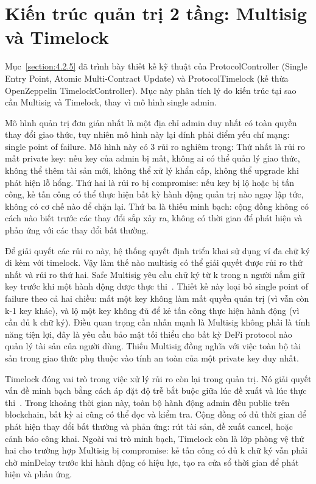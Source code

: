 \documentclass[../DoAn.tex]{subfiles}
\begin{document}
\section{Kiến trúc quản trị 2 tầng: Multisig và Timelock}
\label{section:5.6}


Mục~\ref{section:4.2.5} đã trình bày thiết kế kỹ thuật của ProtocolController (Single Entry Point, Atomic Multi-Contract Update) và ProtocolTimelock (kế thừa OpenZeppelin TimelockController). Mục này phân tích lý do kiến trúc tại sao cần Multisig và Timelock, thay vì mô hình single admin.

Mô hình quản trị đơn giản nhất là một địa chỉ admin duy nhất có toàn quyền thay đổi giao thức, tuy nhiên mô hình này lại dính phải điểm yếu chí mạng: single point of failure. Mô hình này có 3 rủi ro nghiêm trọng: Thứ nhất là rủi ro mất private key: nếu key của admin bị mất, không ai có thể quản lý giao thức, không thể thêm tài sản mới, không thể xử lý khẩn cấp, không thể upgrade khi phát hiện lỗ hổng. Thứ hai là rủi ro bị compromise: nếu key bị lộ hoặc bị tấn công, kẻ tấn công có thể thực hiện bất kỳ hành động quản trị nào ngay lập tức, không có cơ chế nào để chặn lại. Thứ ba là thiếu minh bạch: cộng đồng không có cách nào biết trước các thay đổi sắp xảy ra, không có thời gian để phát hiện và phản ứng với các thay đổi bất thường.

Để giải quyết các rủi ro này, hệ thống quyết định triển khai sử dụng ví đa chữ ký đi kèm với timelock. Vậy làm thế nào multisig có thể giải quyết được rủi ro thứ nhất và rủi ro thứ hai. Safe Multisig yêu cầu chữ ký từ k trong n người nắm giữ key trước khi một hành động được thực thi~\cite{SafeGlobalDocs}. Thiết kế này loại bỏ single point of failure theo cả hai chiều: mất một key không làm mất quyền quản trị (vì vẫn còn k-1 key khác), và lộ một key không đủ để kẻ tấn công thực hiện hành động (vì cần đủ k chữ ký). Điều quan trọng cần nhấn mạnh là Multisig không phải là tính năng tiện lợi, đây là yêu cầu bảo mật tối thiểu cho bất kỳ DeFi protocol nào quản lý tài sản của người dùng. Thiếu Multisig đồng nghĩa với việc toàn bộ tài sản trong giao thức phụ thuộc vào tính an toàn của một private key duy nhất.

Timelock đóng vai trò trong việc xử lý rủi ro còn lại trong quản trị. Nó giải quyết vấn đề minh bạch bằng cách áp đặt độ trễ bắt buộc giữa lúc đề xuất và lúc thực thi~\cite{OpenZeppelinDocs}. Trong khoảng thời gian này, toàn bộ hành động admin đều public trên blockchain, bất kỳ ai cũng có thể đọc và kiểm tra. Cộng đồng có đủ thời gian để phát hiện thay đổi bất thường và phản ứng: rút tài sản, đề xuất cancel, hoặc cảnh báo công khai. Ngoài vai trò minh bạch, Timelock còn là lớp phòng vệ thứ hai cho trường hợp Multisig bị compromise: kẻ tấn công có đủ k chữ ký vẫn phải chờ minDelay trước khi hành động có hiệu lực, tạo ra cửa sổ thời gian để phát hiện và phản ứng.
\end{document}
